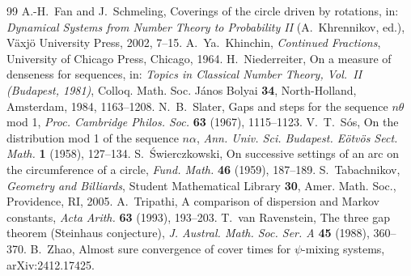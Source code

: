 \documentclass[11pt]{amsart}
\theoremstyle{remark}
\begin{document}
\begin{thebibliography}{99}
 A.-H.~Fan and J.~Schmeling, Coverings of the circle driven by rotations, in: \emph{Dynamical Systems from Number Theory to Probability II} (A.~Khrennikov, ed.), V\"axj\"o University Press, 2002, 7--15.
 A.~Ya.~Khinchin, \emph{Continued Fractions}, University of Chicago Press, Chicago, 1964.
 H.~Niederreiter, On a measure of denseness for sequences, in: \emph{Topics in Classical Number Theory, Vol.~II (Budapest, 1981)}, Colloq. Math. Soc. J\'anos Bolyai \textbf{34}, North-Holland, Amsterdam, 1984, 1163--1208.
 N.~B.~Slater, Gaps and steps for the sequence $n\theta$ mod 1, \emph{Proc. Cambridge Philos. Soc.} \textbf{63} (1967), 1115--1123.
 V.~T.~S\'os, On the distribution mod 1 of the sequence $n\alpha$, \emph{Ann. Univ. Sci. Budapest. E\"otv\"os Sect. Math.} \textbf{1} (1958), 127--134.
 S.~\'Swierczkowski, On successive settings of an arc on the circumference of a circle, \emph{Fund. Math.} \textbf{46} (1959), 187--189.
 S.~Tabachnikov, \emph{Geometry and Billiards}, Student Mathematical Library \textbf{30}, Amer. Math. Soc., Providence, RI, 2005.
 A.~Tripathi, A comparison of dispersion and Markov constants, \emph{Acta Arith.} \textbf{63} (1993), 193--203.
 T.~van Ravenstein, The three gap theorem (Steinhaus conjecture), \emph{J. Austral. Math. Soc. Ser. A} \textbf{45} (1988), 360--370.
 B.~Zhao, Almost sure convergence of cover times for $\psi$-mixing systems, arXiv:2412.17425.
\end{thebibliography}
\end{document}
